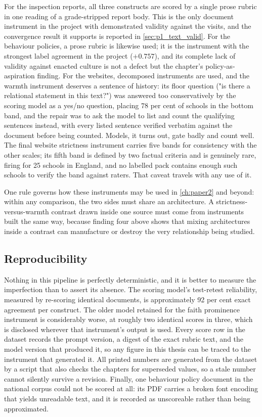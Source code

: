 For the inspection reports, all three constructs are scored by a single
prose rubric in one reading of a grade-stripped report body. This is the
only document instrument in the project with demonstrated validity against
the visits, and the convergence result it supports is reported in
\cref{sec:p1_text_valid}. For the behaviour policies, a prose rubric is
likewise used; it is the instrument with the strongest label agreement in
the project ($+0.757$), and its complete lack of validity against enacted
culture is not a defect but the chapter's policy-as-aspiration finding.
For the websites, decomposed instruments are used, and the warmth
instrument deserves a sentence of history: its floor question ("is there a
relational statement in this text?") was answered too conservatively by the
scoring model as a yes/no question, placing 78 per cent of schools in the
bottom band, and the repair was to ask the model to list and count the
qualifying sentences instead, with every listed sentence verified verbatim
against the document before being counted. Models, it turns out, gate
badly and count well. The final website strictness instrument carries five
bands for consistency with the other scales; its fifth band is defined by
two factual criteria and is genuinely rare, firing for 25 schools in
England, and no labelled pack contains enough such schools to verify the
band against raters. That caveat travels with any use of it.

One rule governs how these instruments may be used in \cref{ch:paper2} and
beyond: within any comparison, the two sides must share an architecture.
A strictness-versus-warmth contrast drawn inside one source must come from
instruments built the same way, because finding four above shows that
mixing architectures inside a contrast can manufacture or destroy the very
relationship being studied.

\subsection{Reproducibility}
\label{sec:p1_scoring_repro}

Nothing in this pipeline is perfectly deterministic, and it is better to
measure the imperfection than to assert its absence. The scoring model's
test-retest reliability, measured by re-scoring identical documents, is
approximately 92 per cent exact agreement per construct. The older model
retained for the faith prominence instrument is considerably worse, at
roughly two identical scores in three, which is disclosed wherever that
instrument's output is used. Every score row in the dataset records the
prompt version, a digest of the exact rubric text, and the model version
that produced it, so any figure in this thesis can be traced to the
instrument that generated it. All printed numbers are generated from the
dataset by a script that also checks the chapters for superseded values, so
a stale number cannot silently survive a revision. Finally, one behaviour
policy document in the national corpus could not be scored at all: its PDF
carries a broken font encoding that yields unreadable text, and it is
recorded as unscoreable rather than being approximated.

